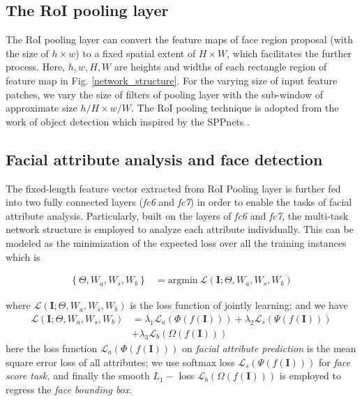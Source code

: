 \documentclass[10pt,twocolumn,letterpaper]{article}
\begin{document}
\subsection{The RoI pooling layer\label{subsec:The-RoI-pooling}}
The RoI pooling layer can convert the feature maps of face region
proposal (with the size of $h\times w$) to a fixed spatial extent
of $H\times W$, which facilitates the further process. Here, $h,w,H,W$
are heights and widths of each rectangle region of feature map in
Fig. \ref{network_structure}. For the varying size of input feature patches,
we vary the size of filters of pooling layer with the sub-window of
approximate size $h/H\times w/W$. The RoI pooling technique is 
 adopted from the work of object detection \cite{fast_rcnn} which inspired by the SPPnets \cite{he2014spatial}.

\subsection{Facial attribute analysis and face detection \label{subsec:Facial-attribute-analysis}}

The fixed-length feature vector extracted from RoI Pooling layer is
further fed into two fully connected layers (\emph{fc6} and \emph{fc7})
in order to enable the tasks of facial attribute analysis. Particularly,
built on the layers of \emph{fc6} and \emph{fc7, }the multi-task network
structure is employed to analyze each attribute individually. This
can be modeled as the minimization of the expected loss over all the
training instances which is

\begin{align}
\left\{ \Theta,W_{a},W_{s},W_{b}\right\}  & =\underset{}{\mathrm{argmin}}\:\mathcal{L}\left(\mathbf{I};\Theta,W_{a},W_{s},W_{b}\right)\label{eq:baseline_model}
\end{align}

\noindent where $\mathcal{L}\left(\mathbf{I};\Theta,W_{a},W_{s},W_{b}\right)$
is the loss function of jointly learning; and we have 
\begin{align}
\mathcal{L}\left(\mathbf{I};\Theta,W_{a},W_{s},W_{b}\right) & =\lambda_{1}\mathcal{L}_{a}\left(\Phi\left(f\left(\mathbf{I}\right)\right)\right)+\lambda_{2}\mathcal{L}_{s}\left(\Psi\left(f\left(\mathbf{I}\right)\right)\right)\label{eq:loss_func_split}\\
 & +\lambda_{3}\mathcal{L}_{b}\left(\Omega\left(f\left(\mathbf{I}\right)\right)\right)\nonumber 
\end{align}
here the loss function $\mathcal{L}_{a}\left(\Phi\left(f\left(\mathbf{I}\right)\right)\right)$
on \emph{facial attribute prediction} is the mean square error loss
of all attributes; we use softmax loss $\mathcal{L}_{s}\left(\Psi\left(f\left(\mathbf{I}\right)\right)\right)$
for \emph{face score task,} and finally the smooth $L_{1}-$ loss
$\mathcal{L}_{b}\left(\Omega\left(f\left(\mathbf{I}\right)\right)\right)$
\cite{fast_rcnn} is employed to regress the \emph{face bounding box}.
\end{document}
